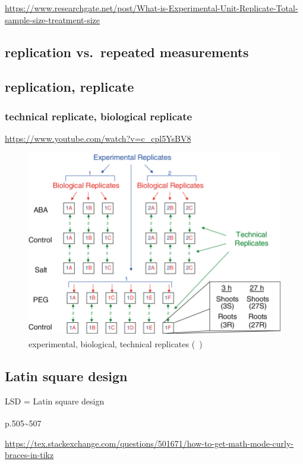 \documentclass[
]{book}
\theoremstyle{definition}
\theoremstyle{definition}
\theoremstyle{definition}
\theoremstyle{definition}
\theoremstyle{remark}
\begin{document}
\url{https://www.researchgate.net/post/What-is-Experimental-Unit-Replicate-Total-sample-size-treatment-size}

\subsection{replication vs.~repeated measurements}\label{replication-vs.-repeated-measurements}

\subsection{replication, replicate}\label{replication-replicate}

\subsubsection{technical replicate, biological replicate}\label{technical-replicate-biological-replicate}

\url{https://www.youtube.com/watch?v=c_cpl5YsBV8}



\begin{figure}
\includegraphics[width=0.65\linewidth]{img/buchanan2005-replicates} \caption{experimental, biological, technical replicates (~\textsuperscript{})}\label{fig:unnamed-chunk-1}
\end{figure}

\subsection{Latin square design}\label{latin-square-design}

LSD = Latin square design

\textsuperscript{} p.505\textasciitilde507

\url{https://tex.stackexchange.com/questions/501671/how-to-get-math-mode-curly-braces-in-tikz}
\end{document}
